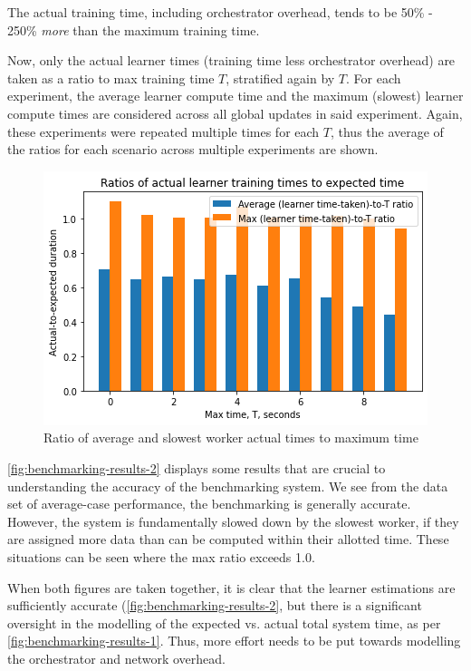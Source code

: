 \documentclass[../mthe-493-final-project.tex]{subfiles}
\begin{document}
    The actual training time, including orchestrator overhead, tends to be 50\% - 250\% \textit{more} than the maximum training time. 
    
    Now, only the actual learner times (training time less orchestrator overhead) are taken as a ratio to max training time $T$, stratified again by $T$. For each experiment, the average learner compute time and the maximum (slowest) learner compute times are considered across all global updates in said experiment. Again, these experiments were repeated multiple times for each $T$, thus the average of the ratios for each scenario across multiple experiments are shown.
    
    \begin{figure}
        \centering
        \includegraphics[width=150mm,scale=0.5]{thesis/img/average-max-learner-actual-times.png}
        \caption{Ratio of average and slowest worker actual times to maximum time}
        \label{fig:benchmarking-results-2}
    \end{figure}
    
    \autoref{fig:benchmarking-results-2} displays some results that are crucial to understanding the accuracy of the benchmarking system. We see from the data set of average-case performance, the benchmarking is generally accurate. However, the system is fundamentally slowed down by the slowest worker, if they are assigned more data than can be computed within their allotted time. These situations can be seen where the max ratio exceeds 1.0.
    
    When both figures are taken together, it is clear that the learner estimations are sufficiently accurate (\autoref{fig:benchmarking-results-2}, but there is a significant oversight in the modelling of the expected vs. actual total system time, as per \autoref{fig:benchmarking-results-1}. Thus, more effort needs to be put towards modelling the orchestrator and network overhead.
    
\end{document}
